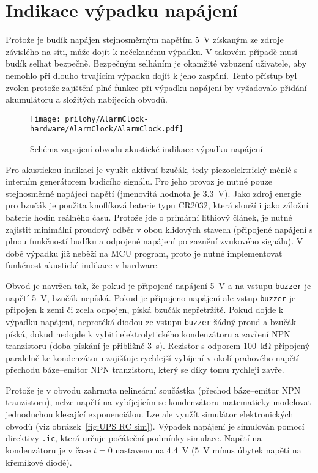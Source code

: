 \section{Indikace výpadku napájení}
Protože je budík napájen stejnosměrným napětím \SI{5}{\volt} získaným ze zdroje
závislého na síti, může dojít k nečekanému výpadku. V takovém případě musí
budík selhat bezpečně. Bezpečným selháním je okamžité vzbuzení uživatele, aby
nemohlo při dlouho trvajícím výpadku dojít k jeho zaspání. Tento přístup byl
zvolen protože zajištění plné funkce při výpadku napájení by vyžadovalo přidání
akumulátoru a složitých nabíjecích obvodů.

\begin{figure}
    \centering
    \texttt{[image: prilohy/AlarmClock-hardware/AlarmClock/AlarmClock.pdf]}
    \par\bigskip
    \caption{Schéma zapojení obvodu akustické indikace výpadku napájení}
    \label{fig:UPS sch}
\end{figure}

Pro akustickou indikaci je využit aktivní bzučák, tedy piezoelektrický měnič
s interním generátorem budicího signálu. Pro jeho provoz je nutné pouze
stejnosměrné napájecí napětí (jmenovitá hodnota je \SI{3,3}{\volt}).
Jako zdroj energie pro bzučák je použita knoflíková baterie typu CR2032, která
slouží i jako záložní baterie hodin reálného času. Protože jde o primární
lithiový článek, je nutné zajistit minimální proudový odběr v obou klidových
stavech (připojené napájení s plnou funkčností budíku a odpojené napájení po
zaznění zvukového signálu). V době výpadku již neběží na MCU program, proto je
nutné implementovat funkčnost akustické indikace v hardware.

Obvod je navržen tak, že pokud je připojené napájení \SI{5}{\volt} a na vstupu
\texttt{buzzer} je napětí \SI{5}{\volt}, bzučák nepíská. Pokud je připojeno
napájení ale vstup \texttt{buzzer} je připojen k zemi či zcela odpojen, píská
bzučák nepřetržitě. Pokud dojde k výpadku napájení, neprotéká diodou ze vstupu
\texttt{buzzer} žádný proud a bzučák píská, dokud nedojde k vybití
elektrolytického kondenzátoru a zavření NPN tranzistoru (doba pískání je
přibližně \SI{3}{\second}). Rezistor s odporem \SI{100}{\kilo\ohm} připojený
paralelně ke kondenzátoru zajišťuje rychlejší vybíjení v okolí prahového napětí
přechodu báze--emitor NPN tranzistoru, který se díky tomu rychleji zavře.

Protože je v obvodu zahrnuta nelineární součástka (přechod báze--emitor NPN
tranzistoru), nelze napětí na vybíjejícím se kondenzátoru matematicky modelovat
jednoduchou klesající exponenciálou. Lze ale využít simulátor elektronických
obvodů (viz obrázek~\vref{fig:UPS RC sim}). Výpadek napájení je simulován
pomocí direktivy \verb|.ic|, která určuje počáteční podmínky simulace. Napětí
na kondenzátoru je v čase $t=0$ nastaveno na \SI{4,4}{\volt} (\SI{5}{\volt}
mínus úbytek napětí na křemíkové diodě).

